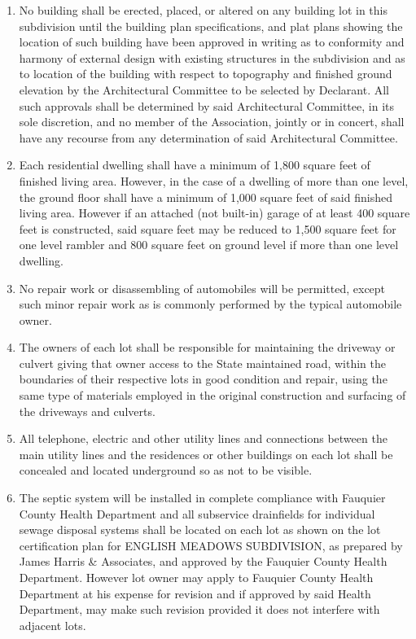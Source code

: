 \documentclass[10pt, letterpaper]{article}
\begin{document}
\begin{enumerate}
  \item No building shall be erected, placed, or altered on any building lot in this subdivision until the building plan specifications, and plat plans showing the location of such building have been approved in writing as to conformity and harmony of external design with existing structures in the subdivision and as to location of the building with respect to topography and finished ground elevation by the Architectural Committee to be selected by Declarant.
    All such approvals shall be determined by said Architectural Committee, in its sole discretion, and no member of the Association, jointly or in concert, shall have any recourse from any determination of said Architectural Committee.
  \item Each residential dwelling shall have a minimum of 1,800 square feet of finished living area.
    However, in the case of a dwelling of more than one level, the ground floor shall have a minimum of 1,000 square feet of said finished living area.
    However if an attached (not built-in) garage of at least 400 square feet is constructed, said square feet may be reduced to 1,500 square feet for one level rambler and 800 square feet on ground level if more than one level dwelling.
  \item No repair work or disassembling of automobiles will be permitted, except such minor repair work as is commonly performed by the typical automobile owner.
  \item The owners of each lot shall be responsible for maintaining the driveway or culvert giving that owner access to the State maintained road, within the boundaries of their respective lots in good condition and repair, using the same type of materials employed in the original construction and surfacing of the driveways and culverts.
  \item All telephone, electric and other utility lines and connections between the main utility lines and the residences or other buildings on each lot shall be concealed and located underground so as not to be visible.
  \item The septic system will be installed in complete compliance with Fauquier County Health Department and all subservice drainfields for individual sewage disposal systems shall be located on each lot as shown on the lot certification plan for ENGLISH MEADOWS SUBDIVISION, as prepared by James Harris \& Associates, and approved by the Fauquier County Health Department.
    However lot owner may apply to Fauquier County Health Department at his expense for revision and if approved by said Health Department, may make such revision provided it does not interfere with adjacent lots.
\end{enumerate}
\end{document}
